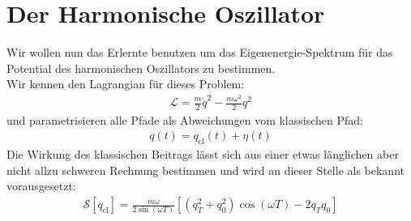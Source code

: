 \section{Der Harmonische Oszillator}
Wir wollen nun das Erlernte benutzen um das Eigenenergie-Spektrum für das  Potential des harmonischen Oszillators zu bestimmen. \\
Wir kennen den Lagrangian für dieses Problem: 
\begin{align}
	\mathcal{L} = \frac{m}{2}\dot{q}^2 - \frac{m\omega^2}{2}q^2
\end{align}
und parametrisieren alle Pfade als Abweichungen vom klassischen Pfad:
\begin{align}
	q(t) = q_{\text{cl}}(t) + \eta(t)
\end{align}
Die Wirkung des klassischen Beitrags lässt sich aus einer etwas länglichen aber nicht allzu schweren Rechnung bestimmen und wird an dieser Stelle als bekannt vorausgesetzt:
\begin{align}
	\mathcal{S}[q_{\text{cl}}] = \frac{m\omega}{2\sin(\omega T)}\left[(q_T^2+q_0^2)\cos(\omega T)- 2q_Tq_0\right]
\end{align}
